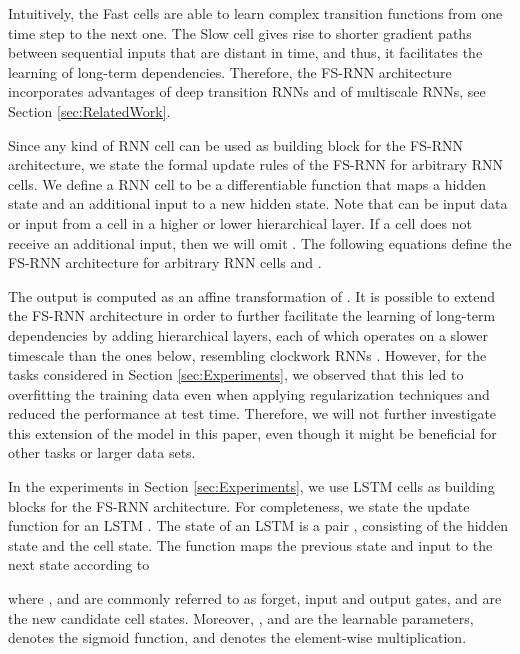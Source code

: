 \documentclass{article}
\begin{document}
Intuitively, the Fast cells are able to learn complex transition functions from one time step to the next one. The Slow cell gives rise to shorter gradient paths between sequential inputs that are distant in time, and thus, it facilitates the learning of long-term dependencies. Therefore, the FS-RNN architecture incorporates advantages of deep transition RNNs and of multiscale RNNs, see Section \ref{sec:RelatedWork}.   


Since any kind of RNN cell can be used as building block for the FS-RNN architecture, we state the formal update rules of the FS-RNN for arbitrary RNN cells. We define a RNN cell   to be a differentiable function  that maps a hidden state  and an additional input   to a new hidden state. Note that  can be input data or  input from a cell in a higher or lower hierarchical layer.  If a cell does not receive an additional input, then  we will omit . The following equations define the FS-RNN architecture for arbitrary RNN cells  and . 



The output  is computed as an affine transformation of . 
It is possible to extend the FS-RNN architecture in order to further facilitate the learning of long-term dependencies by adding  hierarchical layers, each of which operates on a slower timescale than the ones below, resembling clockwork RNNs \cite{koutnik2014clockwork}. 
However, for the tasks considered in Section \ref{sec:Experiments}, we observed that  this led to overfitting  the training data even when applying regularization techniques and reduced the performance at test time. Therefore, we will not further investigate this extension of the model in this paper, even though it might be beneficial for  other tasks or larger data sets.

In the experiments in Section \ref{sec:Experiments}, we use LSTM cells as building blocks for the FS-RNN architecture. For completeness, we state the update function  for an LSTM . The state of an LSTM is a pair , consisting of the hidden state and the cell state.  The function  maps the previous state and input  to the next state  according to


where ,  and   are commonly referred to as forget, input and output  gates, and  are the new candidate cell states. Moreover, ,  and  are the learnable parameters,  denotes the sigmoid function, and  denotes the element-wise multiplication.

\iffalse
\begin{figure}
    
\caption{Formulation of a LSTM where the hidden state is a tuple.}
\end{figure}
\fi
\end{document}
